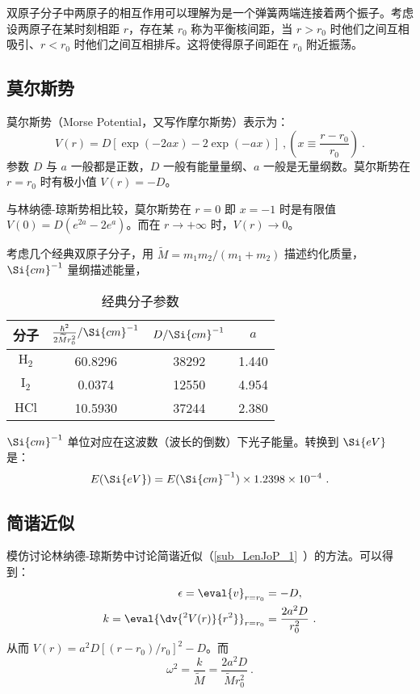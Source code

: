 

双原子分子中两原子的相互作用可以理解为是一个弹簧两端连接着两个振子。考虑设两原子在某时刻相距 $r$，存在某 $r_0$ 称为平衡核间距，当 $r>r_0$ 时他们之间互相吸引、$r<r_0$ 时他们之间互相排斥。这将使得原子间距在 $r_0$ 附近振荡。

\subsection{莫尔斯势}
莫尔斯势（Morse Potential，又写作摩尔斯势）表示为：
\begin{equation}
V(r) = D [\exp(-2ax) - 2\exp(-ax)] \ , \left(x \equiv \frac{r-r_0}{r_0}\right)~.
\end{equation}
参数 $D$ 与 $a$ 一般都是正数，$D$ 一般有能量量纲、$a$ 一般是无量纲数。莫尔斯势在 $r=r_0$ 时有极小值 $V(r)=-D$。

与林纳德-琼斯势相比较，莫尔斯势在 $r = 0$ 即 $x = -1$ 时是有限值 $V(0) = D(e^{2a}-2e^{a})$。而在 $r \rightarrow +\infty$ 时，$V(r) \rightarrow 0$。

考虑几个经典双原子分子，用 $\widetilde{M} = m_1m_2/(m_1+m_2)$ 描述约化质量，$\Si{cm}^{-1}$ 量纲描述能量，
\begin{table}[ht]
\centering
\caption{经典分子参数}\label{tab_MoPoQM1}
\begin{tabular}{|c|c|c|c|}
\hline
分子 & $\frac{\hbar^2}{2 \widetilde{M} r_0^2}/\Si{cm}^{-1}$ & $D/\Si{cm}^{-1}$ & $a$ \\
\hline
$\text{H}_2$ & 60.8296 & 38292 & 1.440 \\
\hline
$\text{I}_2$ & 0.0374 & 12550 & 4.954 \\
\hline
$\text{HCl}$ & 10.5930 & 37244 & 2.380 \\
\hline
\end{tabular}
\end{table}
$\Si{cm}^{-1}$ 单位对应在这波数（波长的倒数）下光子能量。转换到 $\Si{eV}$ 是：
$$E(\Si{eV}) = E(\Si{cm}^{-1}) \times 1.2398 \times 10^{-4} ~.$$

\subsection{简谐近似}
模仿讨论林纳德-琼斯势中讨论简谐近似（\autoref{sub_LenJoP_1}~）的方法。可以得到：
\begin{equation}
\begin{aligned}
\epsilon = \eval{v}_{r = r_0}& = -D ,\\
k = \eval{\dv{^2 V(r)}{r^2}}_{r = r_0}& = \frac{2a^2 D}{r_0^2} ~.
\end{aligned}
\end{equation}
从而 $V(r) = a^2 D[(r-r_0)/r_0]^2 - D$。而 
$$\omega^2 = \frac{k}{\widetilde M} = \frac{2a^2D}{\widetilde Mr_0^2} ~.$$

